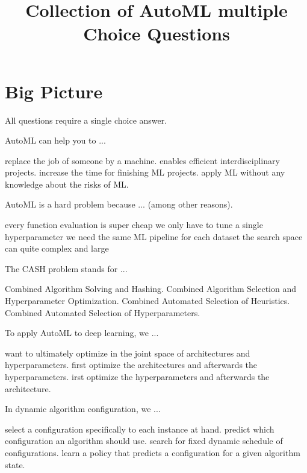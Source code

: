 \documentclass{exam}
\title{Collection of AutoML multiple Choice Questions}
\begin{document}
\maketitle
\section{Big Picture}
All questions require a single choice answer.
\begin{questions}

\question AutoML can help you to ...
\begin{choices}
 \choice replace the job of someone by a machine.
 \choice enables efficient interdisciplinary projects.
 \choice increase the time for finishing ML projects.
 \choice apply ML without any knowledge about the risks of ML.
\end{choices}

\question AutoML is a hard problem because ... (among other reasons).
\begin{choices}
 \choice every function evaluation is super cheap
 \choice we only have to tune a single hyperparameter
 \choice we need the same ML pipeline for each dataset
 \choice the search space can quite complex and large
\end{choices}

\question The CASH problem stands for ...
\begin{choices}
 \choice Combined Algorithm Solving and Hashing.
 \choice Combined Algorithm Selection and Hyperparameter Optimization.
 \choice Combined Automated Selection of Heuristics.
 \choice Combined Automated Selection of Hyperparameters.
\end{choices}

\question  To apply AutoML to deep learning, we ...
\begin{choices}
 \choice want to ultimately optimize in the joint space of architectures and hyperparameters.
 \choice first optimize the architectures and afterwards the hyperparameters.
 \choice irst optimize the hyperparameters and afterwards the architecture.
\end{choices}

\question In dynamic algorithm configuration, we ...
\begin{choices}
 \choice select a configuration specifically to each instance at hand.
 \choice predict which configuration an algorithm should use.
 \choice search for fixed dynamic schedule of configurations.
 \choice learn a policy that predicts a configuration for a given algorithm state.
\end{choices}


\end{questions}
\end{document}
